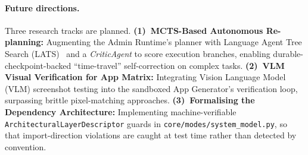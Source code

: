 \documentclass[11pt,a4paper]{article}
\begin{document}
\paragraph{Future directions.}
Three research tracks are planned.
\textbf{(1)~MCTS-Based Autonomous Re-planning:} Augmenting the Admin Runtime's planner with Language Agent Tree Search (LATS)~\cite{zhou2023lats} and a \emph{CriticAgent} to score execution branches, enabling durable-checkpoint-backed ``time-travel'' self-correction on complex tasks.
\textbf{(2)~VLM Visual Verification for App Matrix:} Integrating Vision Language Model (VLM) screenshot testing into the sandboxed App Generator's verification loop, surpassing brittle pixel-matching approaches.
\textbf{(3)~Formalising the Dependency Architecture:} Implementing machine-verifiable \texttt{ArchitecturalLayerDescriptor} guards in \texttt{core/modes/system\_model.py}, so that import-direction violations are caught at test time rather than detected by convention.


\end{document}

